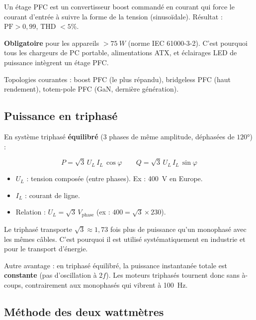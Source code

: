 \documentclass[12pt,a4paper,twoside]{book}
\begin{document}
Un étage PFC est un convertisseur boost commandé en courant qui force le courant d'entrée à suivre la forme de la tension (sinusoïdale). Résultat : $\text{PF} > 0{,}99$, THD $< 5\%$.

\begin{pratique}
\textbf{Obligatoire} pour les appareils $> \SI{75}{W}$ (norme IEC 61000-3-2). C'est pourquoi tous les chargeurs de PC portable, alimentations ATX, et éclairages LED de puissance intègrent un étage PFC.

Topologies courantes : boost PFC (le plus répandu), bridgeless PFC (haut rendement), totem-pole PFC (GaN, dernière génération).
\end{pratique}

\subsection{Puissance en triphasé}

En système triphasé \textbf{équilibré} (3 phases de même amplitude, déphasées de $120°$) :

\begin{formule}
\[
\boxed{P = \sqrt{3}\,U_L\,I_L\,\cos\varphi} \qquad \boxed{Q = \sqrt{3}\,U_L\,I_L\,\sin\varphi}
\]
\begin{itemize}[nosep]
\item $U_L$ : tension composée (entre phases). Ex : \SI{400}{V} en Europe.
\item $I_L$ : courant de ligne.
\item Relation : $U_L = \sqrt{3}\,V_{\text{phase}}$ (ex : $400 = \sqrt{3}\times230$).
\end{itemize}
\end{formule}

\begin{intuition}
Le triphasé transporte $\sqrt{3} \approx 1{,}73$ fois plus de puissance qu'un monophasé avec les mêmes câbles. C'est pourquoi il est utilisé systématiquement en industrie et pour le transport d'énergie.

Autre avantage : en triphasé équilibré, la puissance instantanée totale est \textbf{constante} (pas d'oscillation à $2f$). Les moteurs triphasés tournent donc sans à-coups, contrairement aux monophasés qui vibrent à \SI{100}{Hz}.
\end{intuition}

\subsection{Méthode des deux wattmètres}
\end{document}
